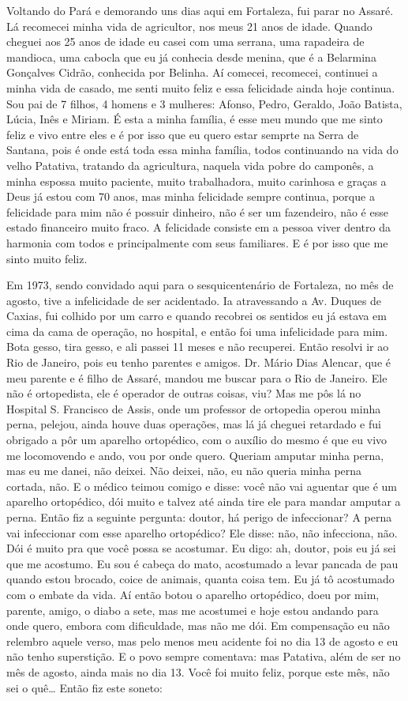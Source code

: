 Voltando do Pará e demorando uns dias aqui em Fortaleza, fui parar no
Assaré. Lá recomecei minha vida de agricultor, nos meus 21 anos de
idade. Quando cheguei aos 25 anos de idade eu casei com uma serrana, uma
rapadeira de mandioca, uma cabocla que eu já conhecia desde menina,
que é a Belarmina Gonçalves Cidrão, conhecida por Belinha. Aí comecei,
recomecei, continuei a minha vida de casado, me senti muito feliz e essa
felicidade ainda hoje continua. Sou pai de 7 filhos, 4 homens e 3
mulheres: Afonso, Pedro, Geraldo, João Batista, Lúcia, Inês e Miriam.
É esta a minha família, é esse meu mundo que me sinto feliz e vivo entre
eles e é por isso que eu quero estar semprte na Serra de Santana, pois é
onde está toda essa minha família, todos continuando na vida do velho
Patativa, tratando da agricultura, naquela vida pobre do camponês, a
minha espossa muito paciente, muito trabalhadora, muito carinhosa e
graças a Deus já estou com 70 anos, mas minha felicidade sempre
continua, porque a felicidade para mim não é possuir dinheiro, não é ser
um fazendeiro, não é esse estado financeiro muito fraco. A felicidade
consiste em a pessoa viver dentro da harmonia com todos e principalmente
com seus familiares. E é por isso que me sinto muito feliz.

Em 1973, sendo convidado aqui para o sesquicentenário de Fortaleza, no
mês de agosto, tive a infelicidade de ser acidentado. Ia atravessando a
Av. Duques de Caxias, fui colhido por um carro e quando recobrei os sentidos eu já estava em cima
da cama de operação, no hospital, e então foi uma infelicidade para mim.
Bota gesso, tira gesso, e ali passei 11 meses e não recuperei. Então
resolvi ir ao Rio de Janeiro, pois eu tenho parentes e amigos. Dr. Mário
Dias Alencar, que é meu parente e é filho de Assaré, mandou me buscar
para o Rio de Janeiro. Ele não é ortopedista, ele é operador de outras
coisas, viu? Mas me pôs lá no Hospital
S. Francisco de Assis, onde um professor de ortopedia operou minha
perna, pelejou, ainda houve duas operações, mas lá já cheguei retardado
e fui obrigado a pôr um aparelho ortopédico, com o auxílio do mesmo é
que eu vivo me locomovendo e ando, vou por onde quero. Queriam amputar
minha perna, mas eu me danei, não deixei. Não deixei, não, eu não queria
minha perna cortada, não. E o médico teimou comigo e disse: você não vai
aguentar que é um aparelho ortopédico, dói muito e talvez até ainda tire
ele para mandar amputar a perna. Então fiz a seguinte pergunta:
doutor, há perigo de infeccionar? A perna vai infeccionar com esse
aparelho ortopédico? Ele disse: não, não infecciona, não. Dói é muito
pra que você possa se acostumar. Eu digo: ah, doutor, pois eu já sei
que me acostumo. Eu sou é cabeça do mato, acostumado a levar pancada de
pau quando estou brocado, coice de animais, quanta coisa tem. Eu já tô
acostumado com o embate da vida. Aí então botou o aparelho ortopédico,
doeu por mim, parente, amigo, o diabo a sete, mas me acostumei e hoje
estou andando para onde quero, embora com dificuldade, mas não me dói.
Em compensação eu não relembro aquele verso, mas pelo menos meu acidente
foi no dia 13 de agosto e eu não tenho superstição. E o povo sempre
comentava: mas Patativa, além de ser no mês de agosto, ainda mais no dia
13. Você foi muito feliz, porque este mês, não sei o quê\ldots{} Então fiz
este soneto:

